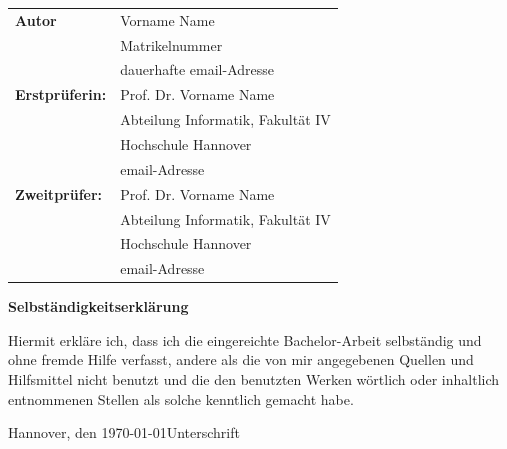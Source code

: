 \documentclass[12pt,DIV14,BCOR10mm,a4paper,twoside,parskip=half-,headsepline,headinclude]{scrreprt}
\begin{document}
  \newpage \thispagestyle{empty}
 \begin{tabular}{ll}
{\bfseries\sffamily Autor} &  Vorname Name \\
            & Matrikelnummer \\
            & dauerhafte email-Adresse \\[5ex]
{\bfseries\sffamily Erstprüferin:} & Prof. Dr. Vorname Name \\
          & Abteilung Informatik, Fakultät IV \\
         & Hochschule Hannover \\
        & email-Adresse \\[5ex]
{\bfseries\sffamily Zweitprüfer:} &Prof. Dr. Vorname Name \\
          & Abteilung Informatik, Fakultät IV \\
         & Hochschule Hannover \\
        & email-Adresse
\end{tabular}

\vfill

\begin{center} \sffamily\bfseries Selbständigkeitserklärung \end{center}

Hiermit erkläre ich, dass ich die eingereichte Bachelor-Arbeit
selbständig und ohne fremde Hilfe verfasst, andere als die von mir angegebenen Quellen
und Hilfsmittel nicht benutzt und die den benutzten Werken wörtlich oder
inhaltlich entnommenen Stellen als solche kenntlich gemacht habe.
\vspace*{7ex}

Hannover, den \today \hfill Unterschrift
  \tableofcontents  %

\listoffigures      %

\listoftables       %

\blinddocument  %

%
%
%
%
%
%
%
\end{document}
